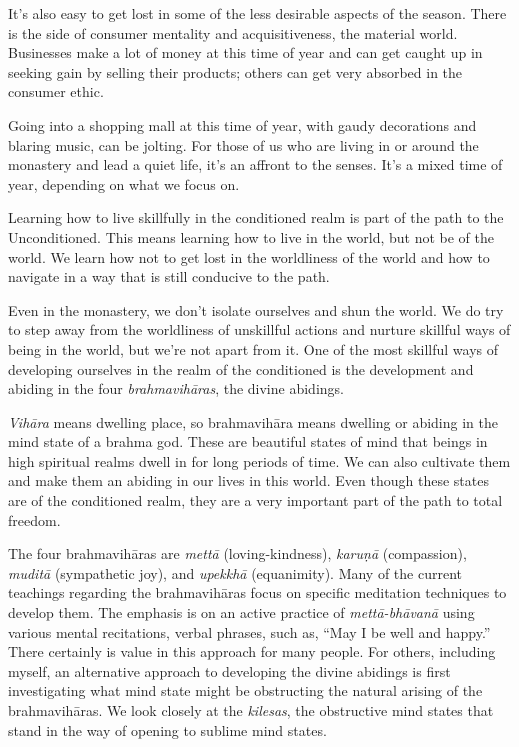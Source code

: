 It's also easy to get lost in some of the less desirable aspects of the season. There is the side of consumer mentality and acquisitiveness, the material world. Businesses make a lot of money at this time of year and can get caught up in seeking gain by selling their products; others can get very absorbed in the consumer ethic.

Going into a shopping mall at this time of year, with gaudy decorations and blaring music, can be jolting. For those of us who are living in or around the monastery and lead a quiet life, it's an affront to the senses. It's a mixed time of year, depending on what we focus on.

Learning how to live skillfully in the conditioned realm is part of the path to the Unconditioned. This means learning how to live in the world, but not be of the world. We learn how not to get lost in the worldliness of the world and how to navigate in a way that is still conducive to the path.

Even in the monastery, we don't isolate ourselves and shun the world. We do try to step away from the worldliness of unskillful actions and nurture skillful ways of being in the world, but we're not apart from it. One of the most skillful ways of developing ourselves in the realm of the conditioned is the development and abiding in the four \emph{brahmavihāras}, the divine abidings.

\emph{Vihāra} means dwelling place, so brahmavihāra means dwelling or abiding in the mind state of a brahma god. These are beautiful states of mind that beings in high spiritual realms dwell in for long periods of time. We can also cultivate them and make them an abiding in our lives in this world. Even though these states are of the conditioned realm, they are a very important part of the path to total freedom.

The four brahmavihāras are \emph{mettā} (loving-kindness), \emph{karuṇā} (compassion), \emph{muditā} (sympathetic joy), and \emph{upekkhā} (equanimity). Many of the current teachings regarding the brahmavihāras focus on specific meditation techniques to develop them. The emphasis is on an active practice of \emph{mettā-bhāvanā} using various mental recitations, verbal phrases, such as, ``May I be well and happy.'' There certainly is value in this approach for many people. For others, including myself, an alternative approach to developing the divine abidings is first investigating what mind state might be obstructing the natural arising of the brahmavihāras. We look closely at the \emph{kilesas}, the obstructive mind states that stand in the way of opening to sublime mind states.

